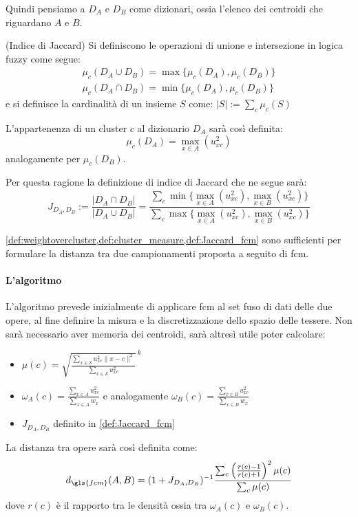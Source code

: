 \noindent Quindi pensiamo a $D_A$ e $D_B$ come dizionari, ossia l'elenco dei centroidi che riguardano $A$ e $B$.
\begin{definition}(Indice di Jaccard)
	\label{def:Jaccard_fcm}
	Si definiscono le operazioni di unione e intersezione in logica fuzzy come segue:
	\begin{align*}
	\mu_c(D_A\cup D_B) = \max\{\mu_c(D_A),\mu_c(D_B)\} \\
	\mu_c(D_A\cap D_B) = \min\{\mu_c(D_A),\mu_c(D_B)\}
	\end{align*}
	e si definisce la cardinalità di un insieme $S$ come: $|S|:=\sum_c \mu_c(S)$

	\noindent L'appartenenza di un cluster $c$ al dizionario $D_A$ sarà così definita:
	\begin{equation}
		\mu_c(D_A) = \max_{x\in A}(u_{xc}^2)
	\end{equation}
	analogamente per $\mu_c(D_B)$.

	\noindent Per questa ragione la definizione di indice di Jaccard che ne segue sarà:
	\begin{equation}
		J_{D_A,D_B} := \frac{|D_A \cap D_B|}{|D_A \cup D_B|} = \frac{\sum_c \min\{\max_{x\in A}(u_{xc}^2),\max_{x\in B}(u_{xc}^2)\}}{\sum_c \max\{\max_{x\in A}(u_{xc}^2),\max_{x\in B}(u_{xc}^2)\}}
	\end{equation}
\end{definition}

\noindent \cref{def:weightovercluster,def:cluster_measure,def:Jaccard_fcm} sono sufficienti per formulare la distanza tra due campionamenti proposta a seguito di \gls{fcm}.


\paragraph{L'algoritmo}
L'algoritmo prevede inizialmente di applicare \gls{fcm} al set fuso di dati delle due opere, al fine definire la misura e la discretizzazione dello spazio delle tessere. Non sarà necessario aver memoria dei centroidi, sarà altresì utile poter calcolare:
\begin{itemize}
	\item $ \mu(c) = {\sqrt{\frac{\sum_{x\in\mathcal{S}} u_{xc}^2 \|x-c\|^2}{\sum_{x\in\mathcal{S}}u_{xc}^2}}\,}^k $
	\item $ \omega_A(c) = \frac{\sum_{x\in A} u_{xc}^2}{\sum_{x\in A}w_x} $ e analogamente $ \omega_B(c) = \frac{\sum_{x\in B} u_{xc}^2}{\sum_{x\in B}w_x} $
	\item $ J_{D_A, D_B} $ definito in \cref{def:Jaccard_fcm}
\end{itemize}
La distanza tra opere sarà così definita come:
\begin{equation}
\label{eq:fuzzy_distance}
	d_{\gls{fcm}}(A, B) = (1 + J_{D_A, D_B})^{-1}\frac{\sum_c \left(\frac{r(c)-1}{r(c)+1}\right)^2 \mu(c)}{\sum_c \mu(c)}
\end{equation}
dove $r(c)$ è il rapporto tra le densità ossia tra $\omega_A(c)$ e $\omega_B(c)$.

